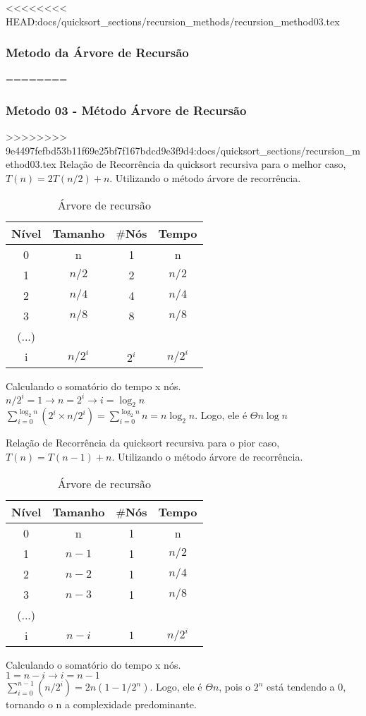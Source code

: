 <<<<<<<< HEAD:docs/quicksort_sections/recursion_methods/recursion_method03.tex
\subsubsection{Metodo da Árvore de Recursão}
========
\subsubsection{Metodo 03 - Método Árvore de Recursão}
>>>>>>>> 9e4497fefbd53b11f69e25bf7f167bdcd9e3f9d4:docs/quicksort_sections/recursion_method03.tex
Relação de Recorrência da quicksort recursiva para o melhor caso, $T(n) = 2T(n/2) + n$. Utilizando o método árvore de recorrência.

\begin{table}[ht!]
    \centering
    \begin{tabular}{|c|c|c|c|}
    \hline
    \textbf{Nível} & \textbf{Tamanho} & $\#$\textbf{Nós} & \textbf{Tempo} \\ \hline
     0 & n & 1 & n \\ \hline
     1 & $n/2$ & 2 & $n/2$ \\ \hline
     2 & $n/4$ & 4 & $n/4$ \\ \hline
     3 & $n/8$ & 8 & $n/8$ \\ \hline
     (...) & & & \\ \hline
     i & $n/2^i$ & $2^i$ & $n/2^i$ \\ \hline 
    \end{tabular}  
    \caption{Árvore de recursão}
\end{table}

Calculando o somatório do tempo x nós. \\
$n/2^i = 1 \rightarrow n = 2^i \rightarrow i = \log_2{n}$ \\
$\sum_{i=0}^{\log_2{n}} (2^i \times n/2^i) = \sum_{i=0}^{\log_2{n}} n = n \log_2{n}$. Logo, ele é $\Theta n \log{n}$ 

Relação de Recorrência da quicksort recursiva para o pior caso, $T(n) = T(n - 1) + n$. Utilizando o método árvore de recorrência.

\begin{table}[ht!]
    \centering
    \begin{tabular}{|c|c|c|c|}
    \hline
    \textbf{Nível} & \textbf{Tamanho} & $\#$\textbf{Nós} & \textbf{Tempo} \\ \hline
     0 & n & 1 & n \\ \hline
     1 & $n - 1$ & 1 & $n/2$ \\ \hline
     2 & $n - 2$ & 1 & $n/4$ \\ \hline
     3 & $n - 3$ & 1 & $n/8$ \\ \hline
     (...) & & & \\ \hline
     i & $n - i$ & $1$ & $n/2^i$ \\ \hline 
    \end{tabular}  
    \caption{Árvore de recursão}
\end{table}

Calculando o somatório do tempo x nós. \\
$1 = n -i \rightarrow i = n - 1$ \\
$\sum_{i = 0}^{n - 1} (n/2^i) = 2n(1 - 1/2^n)$. Logo, ele é $\Theta n$, pois o $2^n$ está tendendo a 0, tornando o n a complexidade predominante.

